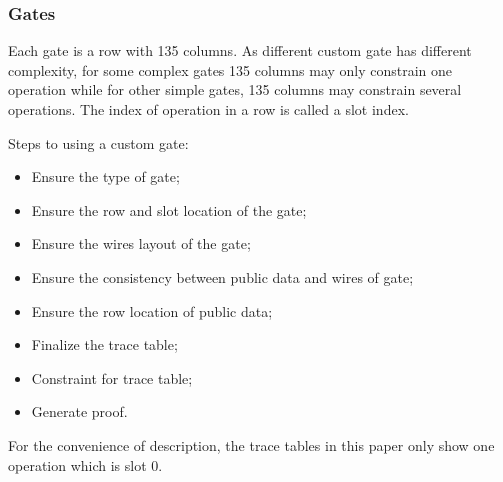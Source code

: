 \subsubsection{Gates} \label{sec:gates}

Each gate is a row with 135 columns. As different custom gate has different complexity, for some complex gates 135 columns may only constrain one
operation while for other simple gates, 135 columns may constrain several operations. The index of operation in a row is called a slot index.

Steps to using a custom gate:
\begin{itemize}
    \item Ensure the type of gate;
    \item Ensure the row and slot location of the gate;
    \item Ensure the wires layout of the gate;
    \item Ensure the consistency between public data and wires of gate;
    \item Ensure the row location of public data;\
    \item Finalize the trace table;
    \item Constraint for trace table;
    \item Generate proof.
\end{itemize}

For the convenience of description, the trace tables in this paper only show one operation which is slot 0.


















